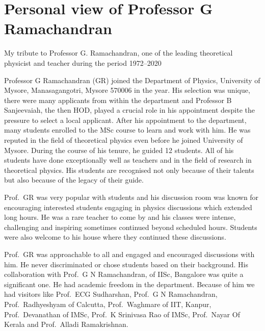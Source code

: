 \chapter{Personal view of Professor G Ramachandran}\label{chap19}



My tribute to Professor G. Ramachandran, one of the leading theoretical physicist and teacher during the period 1972--2020
\medskip

Professor G Ramachandran (GR) joined the Department of Physics, University of Mysore, Manasagangotri, Mysore
570006 in the year. His selection was unique, there were many applicants from within the department
and Professor B Sanjeevaiah, the then HOD, played a crucial role in his appointment despite the pressure to
select a local applicant. After his appointment to the department, many students enrolled to the MSc course to
learn and work with him. He was reputed in the field of theoretical physics even before he joined University of
Mysore. During the course of his tenure, he guided 12 students. All of his students have done exceptionally well
as teachers and in the field of research in theoretical physics. His students are recognised not only because of
their talents but also because of the legacy of their guide.

Prof.\ GR was very popular with students and his discussion room was known for encouraging interested students
engaging in physics discussions which extended long hours. He was a rare teacher to come by and his classes were
intense, challenging and inspiring sometimes continued beyond scheduled hours. Students were also welcome to
his house where they continued these discussions.

Prof.\ GR was approachable to all and engaged and encouraged discussions with him. He never discriminated
or chose students based on their background. His collaboration with Prof.\ G N Ramachandran, of IISc, Bangalore was quite a significant one. He had academic freedom in the department. Because of him we had visitors like Prof.\ ECG Sudharshan, Prof.\ G N Ramachandran, Prof.\ Radhyeshyam of Calcutta, Prof.\ Waghmare of IIT,
Kanpur, Prof.\ Devanathan of IMSc, Prof.\ K Srinivasa Rao of IMSc, Prof.\ Nayar Of Kerala and Prof.\ Alladi Ramakrishnan.

